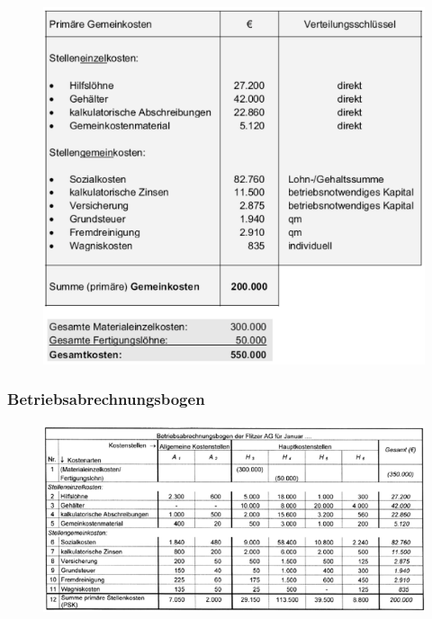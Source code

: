 \documentclass[a4paper,11pt, twoside]{article}
\begin{document}
\begin{figure}[h]
 \begin{center}
   \includegraphics[scale=0.5]{bilder/gemeinkosten.png}
 \end{center}
\end{figure}

\subsubsection*{Betriebsabrechnungsbogen}

\begin{figure}[h]
 \begin{center}
   \includegraphics[scale=0.5]{bilder/bab.png}
 \end{center}
\end{figure}
\newpage 
\end{document}
